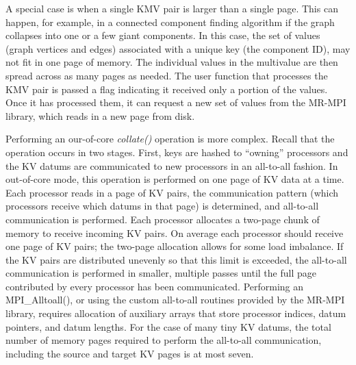 A special case is when a single KMV pair is larger than a single page.
This can happen, for example, in a connected component finding
algorithm if the graph collapses into one or a few giant components.
In this case, the set of values (graph vertices and edges) associated
with a unique key (the component ID), may not fit in one page of
memory.  The individual values in the multivalue are then spread
across as many pages as needed.  The user function that processes the
KMV pair is passed a flag indicating it received only a portion of the
values.  Once it has processed them, it can request a new set of
values from the MR-MPI library, which reads in a new page from disk.

Performing an our-of-core {\it collate()} operation is more complex.
Recall that the operation occurs in two stages.  First, keys are
hashed to ``owning'' processors and the KV datums are communicated to
new processors in an all-to-all fashion.  In out-of-core mode, this
operation is performed on one page of KV data at a time.  Each
processor reads in a page of KV pairs, the communication pattern
(which processors receive which datums in that page) is determined,
and all-to-all communication is performed.  Each processor allocates a
two-page chunk of memory to receive incoming KV pairs.  On average
each processor should receive one page of KV pairs; the two-page
allocation allows for some load imbalance.  If the KV pairs are
distributed unevenly so that this limit is exceeded, the all-to-all
communication is performed in smaller, multiple passes until the full
page contributed by every processor has been communicated.  Performing
an MPI\_Alltoall(), or using the custom all-to-all routines provided
by the MR-MPI library, requires allocation of auxiliary arrays that
store processor indices, datum pointers, and datum lengths.  For the
case of many tiny KV datums, the total number of memory pages required
to perform the all-to-all communication, including the source and
target KV pages is at most seven.

